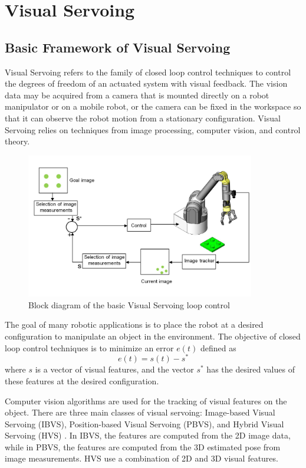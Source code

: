 \section{Visual Servoing}
\subsection{Basic Framework of Visual Servoing}
Visual Servoing refers to the family of closed loop control techniques to control the degrees of freedom of an actuated system with visual feedback\cite{chaumette2006visual}. The vision data may be acquired from a camera that is mounted directly on a robot manipulator or on a mobile robot, or the camera can be fixed in the workspace so that it can observe the robot motion from a stationary configuration. Visual Servoing relies on techniques from image processing, computer vision, and control theory.

\begin{figure}[ht!]
  \centering
  \includegraphics[width=100mm]{figures/vsloop.png}
  \caption{Block diagram of the basic Visual Servoing loop control}
  \label{fig:vsloop}
\end{figure}

The goal of many robotic applications is to place the robot at a desired configuration to manipulate an object in the environment. The objective of closed loop control techniques is to minimize an error $e(t)$ defined as
\begin{equation}
  e(t) = s(t) - s^{*}
  \label{eq:servo1}
\end{equation}
where $s$ is a vector of visual features, and the vector $s^*$ has the desired values of these features at the desired configuration.

Computer vision algorithms are used for the tracking of visual features on the object. There are three main classes of visual servoing: Image-based Visual Servoing (IBVS), Position-based Visual Servoing (PBVS), and Hybrid Visual Servoing (HVS) \cite{chaumette2006visual}\cite{chaumette2007visual}. In IBVS, the features are computed from the 2D image data, while in PBVS, the features are computed from the 3D estimated pose from image measurements. HVS use a combination of 2D and 3D visual features.

